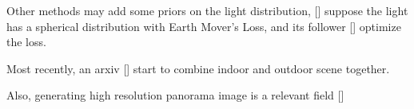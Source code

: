 \documentclass{article}
\begin{document}
Other methods may add some priors on the light distribution, [\cite{zhanGMLightLightingEstimation2022}] suppose the light has a spherical distribution
with Earth Mover's Loss, and its follower [\cite{zhanGMLightLightingEstimation2022}] optimize the loss.

Most recently, an arxiv [\cite{dastjerdiEverLightIndoorOutdoorEditable2023}] start to combine indoor and outdoor scene together.

Also, generating high resolution panorama image is a relevant field [\cite{yanHORIZONHighResolutionPanorama2022}]




\end{document}
